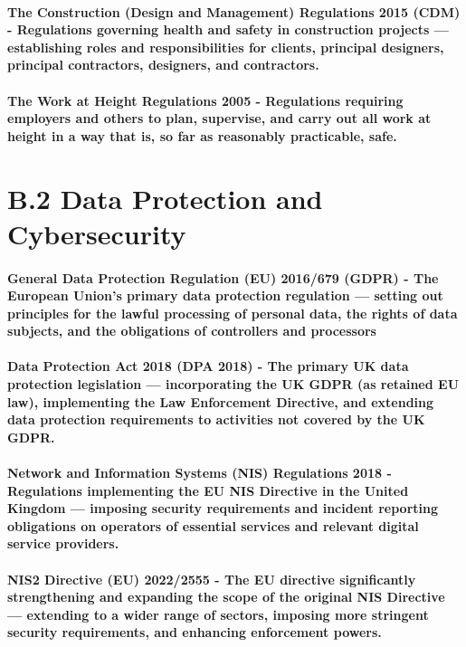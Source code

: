 \paragraph{\textbf{The Construction (Design and Management) Regulations 2015 (CDM)} - Regulations governing health and safety in construction projects — establishing roles and responsibilities for clients, principal designers, principal contractors, designers, and contractors.}
\paragraph{\textbf{The Work at Height Regulations 2005} - Regulations requiring employers and others to plan, supervise, and carry out all work at height in a way that is, so far as reasonably practicable, safe.}

\section*{B.2 Data Protection and Cybersecurity}
\paragraph{\textbf{General Data Protection Regulation (EU) 2016/679 (GDPR)} - The European Union's primary data protection regulation — setting out principles for the lawful processing of personal data, the rights of data subjects, and the obligations of controllers and processors}
\paragraph{\textbf{Data Protection Act 2018 (DPA 2018)} - The primary UK data protection legislation — incorporating the UK GDPR (as retained EU law), implementing the Law Enforcement Directive, and extending data protection requirements to activities not covered by the UK GDPR.}
\paragraph{\textbf{Network and Information Systems (NIS) Regulations 2018} - Regulations implementing the EU NIS Directive in the United Kingdom — imposing security requirements and incident reporting obligations on operators of essential services and relevant digital service providers.}
\paragraph{\textbf{NIS2 Directive (EU) 2022/2555} - The EU directive significantly strengthening and expanding the scope of the original NIS Directive — extending to a wider range of sectors, imposing more stringent security requirements, and enhancing enforcement powers.}
